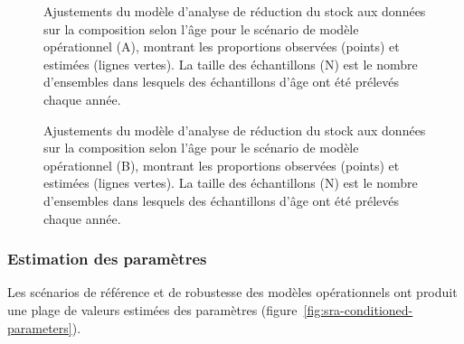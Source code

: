 \documentclass[french,11pt]{book}
\begin{document}
\begin{figure}[htb]

{\centering {} 

}

\caption{Ajustements du modèle d'analyse de réduction du stock aux données sur la composition selon l'âge pour le scénario de modèle opérationnel (A), montrant les proportions observées (points) et estimées (lignes vertes). La taille des échantillons (N) est le nombre d'ensembles dans lesquels des échantillons d'âge ont été prélevés chaque année.}\label{fig:sra-conditioned-comp-fitA}
\end{figure}
\clearpage


\begin{figure}[htb]

{\centering {} 

}

\caption{Ajustements du modèle d'analyse de réduction du stock aux données sur la composition selon l'âge pour le scénario de modèle opérationnel (B), montrant les proportions observées (points) et estimées (lignes vertes). La taille des échantillons (N) est le nombre d'ensembles dans lesquels des échantillons d'âge ont été prélevés chaque année.}\label{fig:sra-conditioned-comp-fitB}
\end{figure}
\hypertarget{sec:approach3-conditioning-parameters}{%
\subsubsection{Estimation des paramètres}\label{sec:approach3-conditioning-parameters}}

Les scénarios de référence et de robustesse des modèles opérationnels ont produit une plage de valeurs estimées des paramètres (figure~\ref{fig:sra-conditioned-parameters}).
\end{document}
